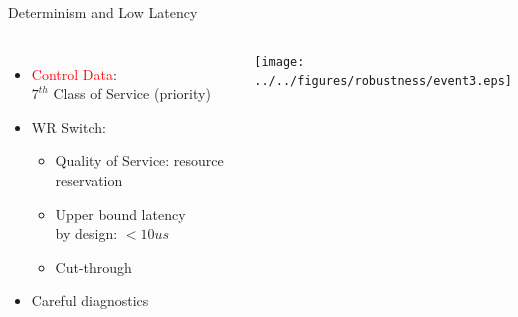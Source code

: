 \documentclass[compress,red]{beamer}
\begin{document}
\begin{frame}{Determinism and Low Latency}

\begin{columns}[c]

      \begin{itemize}
	    \item \textcolor{red}{Control Data}: \\$7^{th}$ Class of Service (priority)
	    \item WR Switch:
	    \begin{itemize}
	      \item Quality of Service: resource reservation
	      \item Upper bound latency \\ by design: $<10us$
	      \item Cut-through
	    \end{itemize}
	    \item Careful diagnostics
      \end{itemize}
% 
    \begin{center}
    \texttt{[image: ../../figures/robustness/event3.eps]} 
    \end{center}

\end{columns}

\end{frame}
% 
% 
\end{document}
